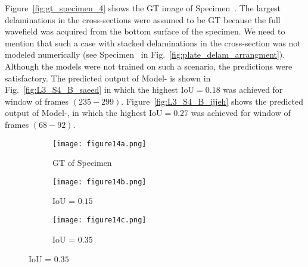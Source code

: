 \begin{sloppypar}
	Figure~\ref{fig:gt_specimen_4} shows the GT image of Specimen~.
	The largest delaminations in the cross-sections were assumed to be GT because the full wavefield was acquired from the bottom surface of the specimen.
	We need to mention that such a case with stacked delaminations in the cross-section was not modeled numerically (see Specimen~ in Fig.~\ref{fig:plate_delam_arrangment}).
	Although the models were not trained on such a scenario, the predictions were satisfactory.
	The predicted output of Model- is shown in Fig.~\ref{fig:L3_S4_B_saeed} in which the highest IoU\(=0.18\) was achieved for window of frames \((235-299)\).
	Figure~\ref{fig:L3_S4_B_ijjeh} shows the predicted output of Model-, in which the highest IoU\(=0.27\) was achieved for window of frames \((68-92)\).
	\begin{figure} [!ht]
		\centering
		\begin{subfigure}[b]{0.32\textwidth}
			\centering
			\texttt{[image: figure14a.png]}
			\caption{GT of Specimen~}
			\label{fig:gt_specimen_2}
		\end{subfigure}
		\hfill
		\begin{subfigure}[b]{0.32\textwidth}
			\centering
			\texttt{[image: figure14b.png]}
			\caption{IoU = \(0.15\)} 
			\label{fig:L3_S2_B_saeed}
		\end{subfigure}
		\hfill
		\begin{subfigure}[b]{0.32\textwidth}
			\centering
			\texttt{[image: figure14c.png]}
			\caption{IoU = \(0.35\)} 
			\label{fig:L3_S2_B_ijjeh}
		\end{subfigure}
		\par\medskip

\end{figure}
\end{sloppypar}
